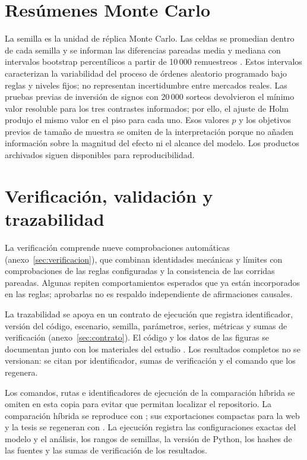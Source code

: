 \section{Resúmenes Monte Carlo}
\label{sec:analisis-estadistico}

La semilla es la unidad de réplica Monte Carlo. Las celdas se promedian dentro de cada semilla y se informan las diferencias pareadas media y mediana con intervalos bootstrap percentílicos a partir de 10\,000 remuestreos \cite{efron1979bootstrap}. Estos intervalos caracterizan la variabilidad del proceso de órdenes aleatorio programado bajo reglas y niveles fijos; no representan incertidumbre entre mercados reales. Las pruebas previas de inversión de signos con 20\,000 sorteos devolvieron el mínimo valor resoluble para los tres contrastes informados; por ello, el ajuste de Holm produjo el mismo valor en el piso para cada uno. Esos valores $p$ y los objetivos previos de tamaño de muestra se omiten de la interpretación porque no añaden información sobre la magnitud del efecto ni el alcance del modelo. Los productos archivados siguen disponibles para reproducibilidad.

\section{Verificación, validación y trazabilidad}

La verificación comprende nueve comprobaciones automáticas (anexo~\ref{sec:verificacion}), que combinan identidades mecánicas y límites con comprobaciones de las reglas configuradas y la consistencia de las corridas pareadas. Algunas repiten comportamientos esperados que ya están incorporados en las reglas; aprobarlas no es respaldo independiente de afirmaciones causales.

La trazabilidad se apoya en un contrato de ejecución que registra identificador, versión del código, escenario, semilla, parámetros, series, métricas y sumas de verificación (anexo~\ref{sec:contrato}). El código y los datos de las figuras se documentan junto con los materiales del estudio \cite{calderon2026repository}. Los resultados completos no se versionan: se citan por identificador, sumas de verificación y el comando que los regenera.

\ifdefined\blindreviewmode
Los comandos, rutas e identificadores de ejecución de la comparación híbrida se omiten en esta copia para evitar que permitan localizar el repositorio.
\else
La comparación híbrida se reproduce con ; sus exportaciones compactas para la web y la tesis se regeneran con . La ejecución \code{\HybridRunID} registra las configuraciones exactas del modelo y el análisis, los rangos de semillas, la versión de Python, los hashes de las fuentes y las sumas de verificación de los resultados.
\fi
